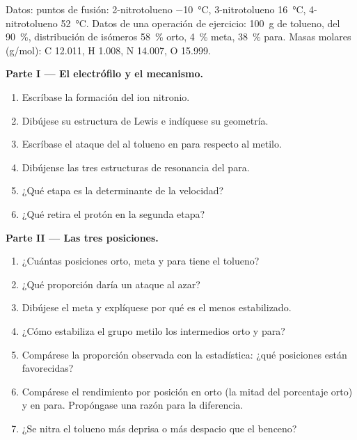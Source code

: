 \begin{problem}
\label{pb:b2:aromatic-substitution:1}
Datos: puntos de fusión: 2-nitrotolueno \qty{-10}{\degreeCelsius}, 3-nitrotolueno
\qty{16}{\degreeCelsius}, 4-nitrotolueno \qty{52}{\degreeCelsius}. Datos de una operación de ejercicio:
\qty{100}{g} de tolueno,  del 90~\%, distribución de isómeros 58~\% orto, 4~\% meta,
38~\% para. Masas molares (\unit{g/mol}): C 12.011, H 1.008, N 14.007, O 15.999.

\medskip
\noindent\textbf{Parte I --- El electrófilo y el mecanismo.}
\begin{enumerate}
  \item Escríbase la formación del ion nitronio.
  \item Dibújese su estructura de Lewis e indíquese su geometría.
  \item Escríbase el ataque del  al tolueno en para respecto al metilo.
  \item Dibújense las tres estructuras de resonancia del  para.
  \item ¿Qué etapa es la determinante de la velocidad?
  \item ¿Qué retira el protón en la segunda etapa?
\end{enumerate}

\medskip
\noindent\textbf{Parte II --- Las tres posiciones.}
\begin{enumerate}[resume]
  \item ¿Cuántas posiciones orto, meta y para tiene el tolueno?
  \item ¿Qué proporción daría un ataque al azar?
  \item Dibújese el  meta y explíquese por qué es el menos estabilizado.
  \item ¿Cómo estabiliza el grupo metilo los intermedios orto y para?
  \item Compárese la proporción observada con la estadística: ¿qué posiciones están favorecidas?
  \item Compárese el rendimiento por posición en orto (la mitad del porcentaje orto) y en para.
        Propóngase una razón para la diferencia.
  \item ¿Se nitra el tolueno más deprisa o más despacio que el benceno?
\end{enumerate}


\end{problem}
